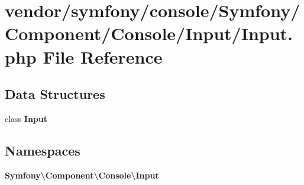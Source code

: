 \section{vendor/symfony/console/\+Symfony/\+Component/\+Console/\+Input/\+Input.php File Reference}
\label{symfony_2console_2_symfony_2_component_2_console_2_input_2_input_8php}
\subsection*{Data Structures}
\begin{DoxyCompactItemize}
\item 
class {\bf Input}
\end{DoxyCompactItemize}
\subsection*{Namespaces}
\begin{DoxyCompactItemize}
\item 
 {\bf Symfony\textbackslash{}\+Component\textbackslash{}\+Console\textbackslash{}\+Input}
\end{DoxyCompactItemize}
